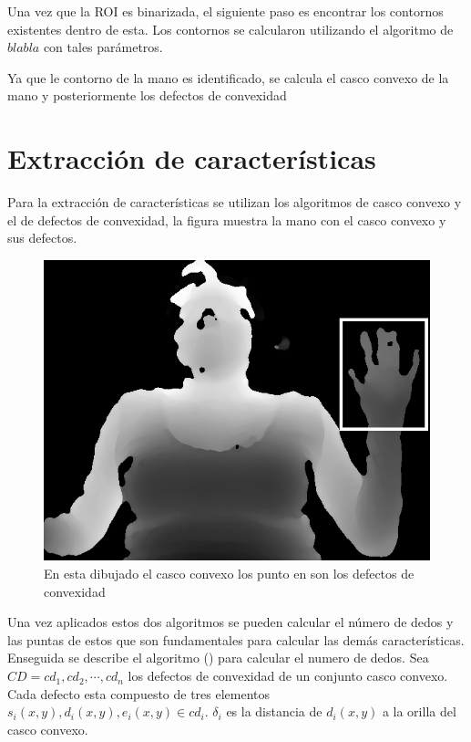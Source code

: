 Una vez que la ROI es binarizada, el siguiente paso es encontrar los contornos existentes dentro de esta. Los contornos se calcularon utilizando el algoritmo de $blabla$ con tales parámetros.  

Ya que le contorno de la mano es identificado, se calcula el casco convexo de la mano y posteriormente los defectos de convexidad 

\section{Extracci\'on de caracter\'isticas}\label{sec:ExtraccionCaracteristicasSystem}

Para la extracción de características se utilizan los algoritmos de casco convexo y el de defectos de convexidad, la figura muestra la mano con el casco convexo y sus defectos. 

\begin{figure}[!h]
\begin{center}
\includegraphics[scale=.5]{./Figures/roi.png}
\end{center}
\caption{En esta dibujado el casco convexo los punto en son los defectos de convexidad}
\label{fig:Convex&Defects}
\end{figure}


Una vez aplicados estos dos algoritmos se pueden calcular el número de dedos y las puntas de estos que son fundamentales para calcular las demás características. Enseguida se describe el algoritmo () para calcular el numero de dedos. 
Sea $CD={cd_1, cd_2, \cdots, cd_n}$ los defectos de convexidad de un conjunto casco convexo. Cada defecto esta compuesto de tres elementos $s_i(x,y),d_i(x,y),e_i(x,y) \in cd_i$. $\delta_i$ es la distancia de $d_i(x,y)$ a la orilla del casco convexo.  

